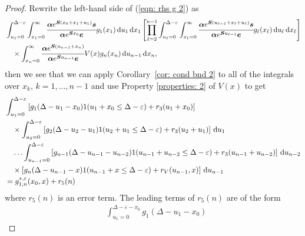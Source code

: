 \begin{proof}
	Rewrite the left-hand side of (\ref{eqn: rhs g 2}) as 
	\begin{align*}
		& \int_{u_1=0}^{\Delta-\varepsilon} \int_{x_1=0}^\infty \cfrac{\bs \alpha e^{\bs{S}(x_{0}+x_1+u_1)}\bs s}{\bs \alpha e^{\bs{S}x_0}\bs e}g_1(x_1) \wrt u_1\wrt x_1 \left[\prod_{\ell=2}^{n-1}\int_{u_\ell=0}^{\Delta-\varepsilon} \int_{x_\ell=0}^\infty \cfrac{\bs \alpha e^{\bs{S}(u_{\ell-1}+x_\ell+u_\ell)}\bs s}{\bs \alpha e^{\bs{S}u_{\ell-1}}\bs e}g_\ell(x_\ell) \wrt u_\ell\wrt x_\ell \right]%
            	\\&{}\quad\times\int_{x_n=0}^\infty \cfrac{\bs \alpha e^{\bs{S}(u_{n-1}+x_n )}}{\bs \alpha e^{\bs{S}u_{n-1}}\bs e} V(x)g_{n}(x_n)\wrt u_{n-1} \wrt x_n,
	\end{align*}
	then we see that we can apply Corollary~\ref{cor: cond bnd 2} to all of the integrals over \(x_k,\, k=1,\dots,n-1\) and use Property \ref{properties: 2} of \(V(x)\) to get  
	\begin{align*}
		& \int_{u_1=0}^{\Delta-\varepsilon}\left[g_1(\Delta - u_1 - x_0)1(u_1 + x_0\leq \Delta - \varepsilon) + r_3 (u_1 + x_0)\right]
		\\&\quad\times\int_{u_2=0}^{\Delta-\varepsilon}\left[g_2(\Delta - u_2 - u_1)1(u_2 + u_1\leq \Delta - \varepsilon) + r_3 (u_2 + u_1)\right]\, \mathrm{d} u_1
		\\&\quad\hdots 
            	 \int_{u_{n-1}=0}^{\Delta-\varepsilon}  \left[g_{n-1}(\Delta - u_{n-1} - u_{n-2}) 1(u_{n-1} + u_{n-2}\leq \Delta - \varepsilon) +   r_3 (u_{n-1} + u_{n-2})\right] \, \mathrm{d} u_{n-2}
            	\\&\quad\times\left[g_{n}(\Delta-u_{n-1}-x)1(u_{n-1}+x\leq \Delta - \varepsilon) + r_V (u_{n-1},x)\right]\, \mathrm{d} u_{n-1}
		\\&=g^{*,\varepsilon}_{1,n}(x_0,x) + r_5(n)
	\end{align*}
	where \(r_5(n)\) is an error term. The leading terms of \(r_5(n)\) are of the form 
	\begin{align*}
		&\int_{u_1=0}^{\Delta-\varepsilon-x_0}g_1(\Delta - u_1 - x_0)

\end{align*}
\end{proof}
